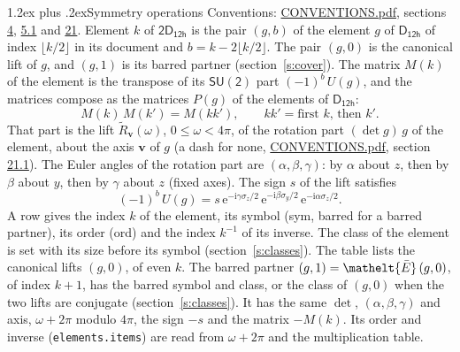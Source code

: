 \documentclass[10pt,a4paper]{article}
\makeatletter
\renewcommand\section{\@startsection{section}{1}{\z@}{-3ex plus -1ex minus -.2ex}%
  {1.2ex plus .2ex}{\normalfont\large\sffamily\bfseries\color{parttitle}}}
\numberwithin{equation}{section}
\newcommand{\eltfont}[1]{{\let\sigma\eltsigma\mathelt{#1}}}
\newcommand{\grp}[1]{\mathsf{#1}}
\newcommand{\elt}[1]{\eltfont{#1}}
\newcommand{\vv}{\mathbf{v}}
\newcommand{\iunit}{\mathrm{i}}
\newcommand{\expe}{\mathrm{e}}
\newcommand{\barred}[1]{\bar{#1}}
\newcommand{\lift}[1]{\tilde{#1}}
\newcommand{\pauli}[1]{\sigma_{#1}}
\makeatother
\begin{document}
\section{Symmetry operations}\label{s:elements}
Conventions: \href{../../CONVENTIONS.pdf}{CONVENTIONS.pdf}, sections \href{../../../rotation/CONVENTIONS.pdf\#conv.4}{4}, \href{../../../rotation/CONVENTIONS.pdf\#conv.5.1}{5.1} and \href{../../CONVENTIONS.pdf\#conv.21}{21}.
\leavevmode\label{n:index.element}\label{n:element.g}Element $k$ of $\grp{2D_{12h}}$ is the pair $(g, b)$ of the element $g$ of \href{../../../rotation/data/pdf/D12h.pdf}{$\grp{D_{12h}}$} of index $\lfloor k/2\rfloor$ in its document and $b = k - 2\lfloor k/2\rfloor$. The pair $(g, 0)$ is the canonical lift of $g$, and $(g, 1)$ is its barred partner (section~\ref{s:cover}). \label{n:matrix.element.pin}\label{n:matrix.element}The matrix $M(k)$ of the element is the transpose of its $\grp{SU(2)}$ part $(-1)^{b}\,U(g)$, and the matrices compose as the matrices $P(g)$ of the elements of $\grp{D_{12h}}$:
\begin{equation}\label{e:mprod}M(k)\,M(k') = M(kk'),\qquad kk' = \text{first } k\text{, then } k'.\end{equation}
\leavevmode\label{n:angle.omega}\label{n:vector.axis}\label{n:vector.pole}That part is the lift $\lift{R}_{\vv}(\omega)$, $0 \le \omega < 4\pi$, of the rotation part $(\det g)\,g$ of the element, about the axis $\vv$ of $g$ (a dash for none, \href{../../CONVENTIONS.pdf}{CONVENTIONS.pdf}, section \href{../../CONVENTIONS.pdf\#conv.21.1}{21.1}). \label{n:angle.euler.alpha}\label{n:angle.euler.beta}\label{n:angle.euler.gamma}\label{n:vector.coordinates}The Euler angles of the rotation part are $(\alpha,\beta,\gamma)$: by $\alpha$ about $z$, then by $\beta$ about $y$, then by $\gamma$ about $z$ (fixed axes). \label{n:local.euler.sign}The sign $s$ of the lift satisfies
\begin{equation}\label{e:euler}(-1)^{b}\,U(g) = s\,\expe^{-\iunit\gamma\pauli{z}/2}\,\expe^{-\iunit\beta\pauli{y}/2}\,\expe^{-\iunit\alpha\pauli{z}/2}.\end{equation}
\leavevmode\label{n:index.element.inverse}\label{n:head.sym}\label{n:head.ord}A row gives the index $k$ of the element, its symbol (sym, barred for a barred partner), its order (ord) and the index $k^{-1}$ of its inverse. \label{n:head.class}The class of the element is set with its size before its symbol (section~\ref{s:classes}).
The table lists the canonical lifts $(g, 0)$, of even $k$. The barred partner $(g, 1) = \elt{\barred{E}}\,(g, 0)$, of index $k + 1$, has the barred symbol and class, or the class of $(g, 0)$ when the two lifts are conjugate (section~\ref{s:classes}). It has the same $\det$, $(\alpha,\beta,\gamma)$ and axis, $\omega + 2\pi$ modulo $4\pi$, the sign $-s$ and the matrix $-M(k)$. Its order and inverse (\texttt{elements.items}) are read from $\omega + 2\pi$ and the multiplication table.
\end{document}
